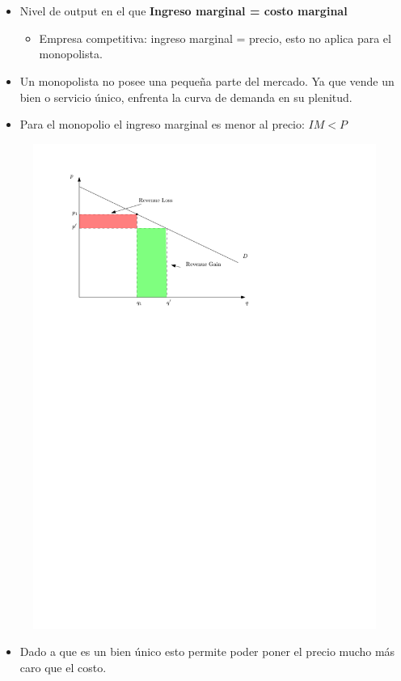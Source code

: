 \section{ }
\begin{itemize}
    \item Nivel de output en el que \textbf{Ingreso marginal = costo marginal}
        \begin{itemize}
            \item Empresa competitiva: ingreso marginal = precio, esto no aplica para el monopolista. 
        \end{itemize}
    
    \item Un monopolista no posee una pequeña parte del mercado. Ya que vende un bien o servicio único, enfrenta la curva de demanda en su plenitud. 
    
    \item Para el monopolio el ingreso marginal es menor al precio: $\displaystyle IM < P$ 
\end{itemize}
\begin{figure}[H]
    \centering
    \includegraphics[]{Clases/figs/monopoly} 
\end{figure}
\begin{itemize}
    \item Dado a que es un bien único esto permite poder poner el precio mucho más caro que el costo. 
\end{itemize}

